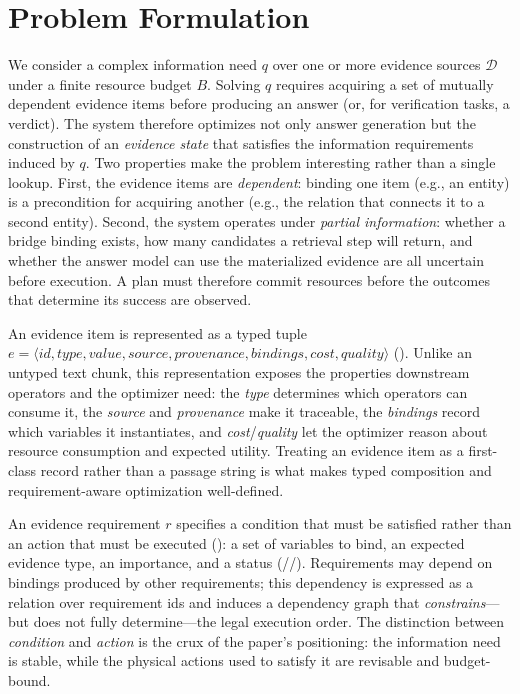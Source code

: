 \section{Problem Formulation}
\label{sec:problem}

We consider a complex information need $q$ over one or more evidence sources
$\mathcal{D}$ under a finite resource budget $B$. Solving $q$ requires
acquiring a set of mutually dependent evidence items before producing an answer
(or, for verification tasks, a verdict). The system therefore optimizes not
only answer generation but the construction of an \emph{evidence state} that
satisfies the information requirements induced by $q$. Two properties make the
problem interesting rather than a single lookup. First, the evidence items are
\emph{dependent}: binding one item (e.g., an entity) is a precondition for
acquiring another (e.g., the relation that connects it to a second entity).
Second, the system operates under \emph{partial information}: whether a bridge
binding exists, how many candidates a retrieval step will return, and whether
the answer model can use the materialized evidence are all uncertain before
execution. A plan must therefore commit resources before the outcomes that
determine its success are observed.

An evidence item is represented as a typed tuple
$e = \langle \mathit{id}, \mathit{type}, \mathit{value}, \mathit{source},
\mathit{provenance}, \mathit{bindings}, \mathit{cost}, \mathit{quality}
\rangle$ (). Unlike an untyped text chunk, this
representation exposes the properties downstream operators and the optimizer
need: the \emph{type} determines which operators can consume it, the
\emph{source} and \emph{provenance} make it traceable, the \emph{bindings}
record which variables it instantiates, and \emph{cost}/\emph{quality} let the
optimizer reason about resource consumption and expected utility. Treating an
evidence item as a first-class record rather than a passage string is what
makes typed composition and requirement-aware optimization well-defined.

An evidence requirement $r$ specifies a condition that must be satisfied rather
than an action that must be executed (): a set of
variables to bind, an expected evidence type, an importance, and a status
(//). Requirements may depend on
bindings produced by other requirements; this dependency is expressed as a
relation over requirement ids and induces a dependency graph that
\emph{constrains}---but does not fully determine---the legal execution order.
The distinction between \emph{condition} and \emph{action} is the crux of the
paper's positioning: the information need is stable, while the physical actions
used to satisfy it are revisable and budget-bound.


